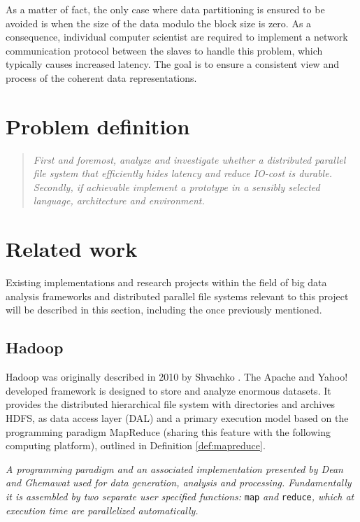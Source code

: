 As a matter of fact, the only case where data partitioning is ensured to be avoided is when the size of the data modulo the block size is zero. As a consequence, individual computer scientist are required to implement a network communication protocol between the slaves to handle this problem, which typically causes increased latency. The goal is to ensure a consistent view and process of the coherent data representations.

\section{Problem definition} \label{sec:problem}
\begin{quotation}
\hspace*{-7mm}
\textit{First and foremost, analyze and investigate whether a distributed parallel file system that efficiently hides latency and reduce IO-cost is durable. Secondly, if achievable implement a prototype in a sensibly selected language, architecture and environment.} \newline
\end{quotation}

\section{Related work} \label{sec:related}
Existing implementations and research projects within the field of big data analysis frameworks and distributed parallel file systems relevant to this project will be described in this section, including the once previously mentioned.

\subsection*{Hadoop}
Hadoop was originally described in 2010 by Shvachko \etal \cite{Shvachko:2010:HDF:1913798.1914427}. The Apache and Yahoo! developed framework is designed to store and analyze enormous datasets. It provides the distributed hierarchical file system with directories and archives HDFS, as data access layer (DAL) and a primary execution model based on the programming paradigm MapReduce (sharing this feature with the following computing platform), outlined in Definition \ref{def:mapreduce}.
\vspace*{2mm}

\begin{definition}[MapReduce] \label{def:mapreduce}
\textit{A programming paradigm and an associated implementation presented by Dean and Ghemawat} \cite{Dean:2008:MSD:1327452.1327492} \textit{used for data generation, analysis and processing. Fundamentally it is assembled by two separate user specified functions:} \texttt{map} \textit{and} \texttt{reduce}\textit{, which at execution time are parallelized automatically.}
\end{definition}
\vspace*{2mm}

